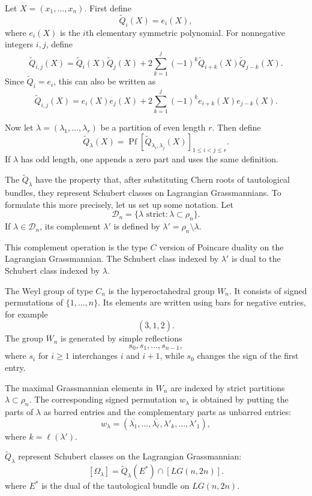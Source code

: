 \documentclass[12pt]{article}
\begin{document}
Let $X=(x_1,\dots,x_n)$.
First define
\[
    \widetilde Q_i(X)=e_i(X),
\]
where $e_i(X)$ is the $i$th elementary symmetric polynomial. For nonnegative integers $i,j$, define
\[
    \widetilde Q_{i,j}(X)
    =
    \widetilde Q_i(X)\widetilde Q_j(X)
    +
    2\sum_{k=1}^j (-1)^k
    \widetilde Q_{i+k}(X)\widetilde Q_{j-k}(X).
\]
Since $\widetilde Q_i=e_i$, this can also be written as
\[
    \widetilde Q_{i,j}(X)
    =
    e_i(X)e_j(X)
    +
    2\sum_{k=1}^j (-1)^k
    e_{i+k}(X)e_{j-k}(X).
\]

Now let $\lambda=(\lambda_1,\dots,\lambda_r)$
be a partition of even length $r$. Then define
\[
    \widetilde Q_\lambda(X)
    =
    \operatorname{Pf}
    \left[
        \widetilde Q_{\lambda_i,\lambda_j}(X)
        \right]_{1\le i<j\le r}.
\]
If $\lambda$ has odd length, one appends a zero part and uses the same definition.

The $\widetilde Q_\lambda$ have the property that, after substituting Chern roots of tautological bundles, they represent Schubert classes on Lagrangian Grassmannians. To formulate this more precisely, let us set up some notation. Let
\[
    \mathcal D_n
    =
    \{\lambda\text{ strict}: \lambda\subset \rho_n\}.
\]
If $\lambda\in \mathcal D_n$, its complement $\lambda'$ is defined by $\lambda'=\rho_n\setminus \lambda$.

This complement operation is the type $C$ version of Poincare duality on the Lagrangian Grassmannian. The Schubert class indexed by $\lambda'$ is dual to the Schubert class indexed by $\lambda$.


The Weyl group of type $C_n$ is the hyperoctahedral group $W_n$. It consists of signed permutations of $\{1,\dots,n\}$. Its elements are written using bars for negative entries, for example
\[
    (\overline{3},1,\overline{2}).
\]
The group $W_n$ is generated by simple reflections
\[
    s_0,s_1,\dots,s_{n-1},
\]
where $s_i$ for $i\ge 1$ interchanges $i$ and $i+1$, while $s_0$ changes the sign of the first entry.

The maximal Grassmannian elements in $W_n$ are indexed by strict partitions $\lambda\subset \rho_n$. The corresponding signed permutation $w_\lambda$ is obtained by putting the parts of $\lambda$ as barred entries and the complementary parts as unbarred entries:
\[
    w_\lambda
    =
    (\overline{\lambda_1},\dots,\overline{\lambda_\ell},
    \lambda'_k,\dots,\lambda'_1),
\]
where $k=\ell(\lambda')$.


\begin{theorem}
    $\widetilde Q_\lambda$ represent Schubert classes on the Lagrangian Grassmannian:
    \[
        [\Omega_\lambda]
        =
        \widetilde Q_\lambda(E^*)\cap [LG(n,2n)].
    \] where $E^*$ is the dual of the tautological bundle on $LG(n,2n)$.
\end{theorem}
\end{document}
